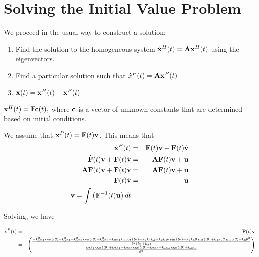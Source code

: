 \documentclass[11pt]{article}
\begin{document}
\section{Solving the Initial Value Problem}
We proceed in the usual way to construct a solution:
\begin{enumerate}
\item Find the
solution to the homogeneous system
\(\dot{\bf x}^H (t) = {\bf A} {\bf x}^H (t)\) using the eigenvectors.
\item
Find a particular solution such that
\(\dot{x}^P (t) = {\bf A} {\bf x}^P (t)\)
\item
\({\bf x} (t) = {\bf x}^H (t) + {\bf x}^P (t)\)
\end{enumerate}

\({\bf x}^H (t) = {\bf F} {\bf c} (t),\) where \({\bf c}\) is a vector
of unknown constants that are determined based on initial conditions.

We assume that \({\bf x}^P (t) = {\bf F}(t) {\bf v}\). This means that
\begin{eqnarray}
\dot{\bf x}^P (t) &= & \dot{\bf F} (t) {\bf v} + {\bf F} (t) \dot{\bf v} \\
\dot{\bf F} (t) {\bf v} + {\bf F} (t) \dot{\bf v} & = & {\bf A} {\bf F}(t) {\bf v} + {\bf u} \\
{\bf A} {\bf F} (t){\bf v} + {\bf F} (t) \dot{\bf v} & = & {\bf A} {\bf F} (t) {\bf v} + {\bf u} \\
{\bf F} (t) \dot{\bf v} & = & {\bf u} \\
{\bf v} = \int \left( {\bf F}^{-1} (t) {\bf u} \right)dt
\end{eqnarray}

    Solving, we have

\begin{eqnarray}
{\bf x}^P (t) & = & {\bf F} (t) {\bf v} \\
& = & \begin{pmatrix}\frac{- k_{2}^{2} k_{4} \cos{\left(t \theta \right)} - k_{2}^{2} k_{4} + k_{2}^{2} k_{6} \cos{\left(t \theta \right)} + k_{2}^{2} k_{6} - k_{2} k_{4} k_{d} \cos{\left(t \theta \right)} - k_{2} k_{4} k_{d} + k_{2} k_{4} \theta \sin{\left(t \theta \right)} - k_{2} k_{6} \theta \sin{\left(t \theta \right)} + k_{4} k_{d} \theta \sin{\left(t \theta \right)} + k_{6} \theta^{2}}{\theta^{2} \left(k_{2} + k_{d}\right)}\\\frac{k_{2} k_{4} \cos{\left(t \theta \right)} + k_{2} k_{4} - k_{2} k_{6} \cos{\left(t \theta \right)} - k_{2} k_{6} + k_{4} k_{d} \cos{\left(t \theta \right)} + k_{4} k_{d}}{\theta^{2}}\end{pmatrix}
\end{eqnarray}
\end{document}
